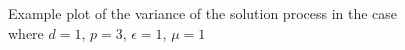 \begin{figure}
    \centering
    \begin{subfigure}[b]{0.65\textwidth}
        \centering
    \end{subfigure}
    \begin{subfigure}[b]{0.55\textwidth}
        \centering
    \end{subfigure}
    \caption{Example plot of the variance of the solution process in the case where
    $d = 1$, $p = 3$, $\epsilon = 1$, $\mu = 1$}
    \label{fig:twod-stochastic-variance-plots}
\end{figure}
